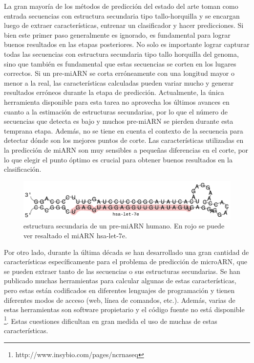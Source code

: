 La gran mayoría de los métodos de predicción del estado del arte toman como entrada secuencias con estructura secundaria tipo tallo-horquilla y se encargan
luego de extraer características, entrenar un clasificador y hacer predicciones. Si bien este primer paso generalmente es ignorado, es fundamental para lograr
buenos resultados en las etapas posteriores. No solo es importante lograr capturar todas las secuencias con estructura secundaria tipo tallo horquilla del
genoma, sino que también es fundamental que estas secuencias se corten en los lugares correctos. Si un pre-miARN se corta erróneamente con una longitud mayor
o menor a la real, las características calculadas pueden variar mucho y generar resultados erróneos durante la etapa de predicción. Actualmente, la única
herramienta disponible para esta tarea \citep{durbin1999einverted} no aprovecha los últimos avances en cuanto a la estimación de estructuras secundarias, por
lo que el número de secuencias que detecta es bajo y muchos pre-miARN se pierden durante esta temprana etapa. Además, no se tiene en cuenta el contexto de la
secuencia para detectar dónde son los mejores puntos de corte. Las características utilizadas en la predicción de miARN son muy sensibles a pequeñas
diferencias en el corte, por lo que elegir el punto óptimo es crucial para obtener buenos resultados en la clasificación.

\begin{figure}[t]
 \centering
 \includegraphics[width=\textwidth]{fig/mirna.pdf}
 \caption[Estructura secundaria de un pre-miARN]{estructura secundaria de un pre-miARN humano. En rojo se puede ver resaltado el miARN hsa-let-7e.}
 \label{fig:mirna}
\end{figure}

Por otro lado, durante la última década se han desarrollado una gran cantidad de características específicamente para el problema de predicción de
microARN, que se pueden extraer tanto de las secuencias o sus estructuras secundarias. Se han publicado muchas herramientas para calcular algunas de estas
características, pero estas están codificados en diferentes lenguajes de programación y tienen diferentes modos de acceso (web, línea de comandos, etc.).
Además, varias de estas herramientas son software propietario y el código fuente no está disponible \footnote{http://www.insybio.com/pages/ncrnaseq}. Estas
cuestiones dificultan en gran medida el uso de muchas de estas características.

